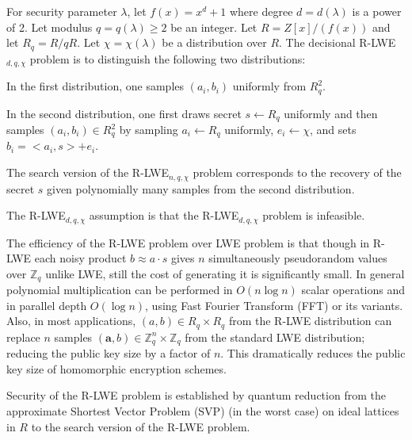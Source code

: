 \begin{definition}
    For security parameter $\lambda$, let $f(x) = x^d+1$ where degree $d = d(\lambda)$ is a power of 2. Let modulus $q = q(\lambda) \geq 2$ be an integer. Let $R = Z[x]/(f(x))$ and let $R_q = R/qR$. Let $\chi = \chi(\lambda)$ be a distribution over $R$. The decisional R-LWE$_{d,q,\chi}$ problem is to distinguish the following two distributions:

    In the first distribution, one samples $(a_i, b_i)$ uniformly from $R^2_q$.

    In the second distribution, one first draws secret $s \leftarrow R_q$ uniformly and then samples $(a_i, b_i) \in R^2_q$ by sampling $a_i \leftarrow R_q$ uniformly, $e_i \leftarrow \chi$, and sets $b_i = <a_i, s> + e_i$.

    The search version of the R-LWE$_{n,q,\chi}$ problem corresponds to the recovery of the secret $s$ given polynomially many samples from the second distribution.

    The R-LWE$_{d,q,\chi}$ assumption is that the R-LWE$_{d,q,\chi}$ problem is infeasible.
\end{definition}

The efficiency of the R-LWE problem over LWE problem is that though in R-LWE each noisy product $b \approx a\cdot s$ gives $n$ simultaneously pseudorandom values over $\mathbb{Z}_q$ unlike LWE, still the cost of generating it is significantly small. In general polynomial multiplication can be performed in $O(n\log{n})$ scalar operations and in parallel depth $O(\log{n})$, using  Fast Fourier Transform (FFT) or its variants. Also, in most applications, $(a,b)\in R_q \times R_q$ from the R-LWE distribution can replace $n$ samples $(\textbf{a},b)\in \mathbb{Z}_q^n\times \mathbb{Z}_q$ from the standard LWE distribution; reducing the public key size by a factor of $n$. This dramatically reduces the public key size of homomorphic encryption schemes.

Security of the R-LWE problem is established by quantum reduction from the approximate Shortest Vector Problem (SVP) (in the worst case) on ideal lattices in $R$ to the search version of the R-LWE problem.

